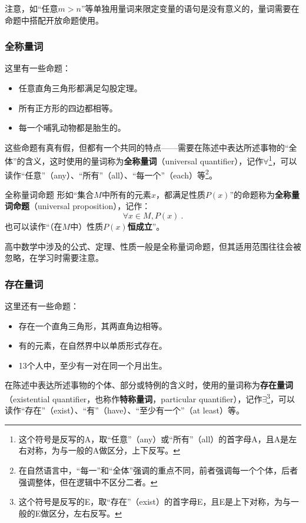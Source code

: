 注意，如“任意$m>n$”等单独用量词来限定变量的语句是没有意义的，量词需要在命题中搭配开放命题使用。

\subsubsection{全称量词}

这里有一些命题：
\begin{itemize}
\item 任意直角三角形都满足勾股定理。
\item 所有正方形的四边都相等。
\item 每一个哺乳动物都是胎生的。
\end{itemize}

这些命题有真有假，但都有一个共同的特点——需要在陈述中表达所述事物的“全体”的含义，这时使用的量词称为\textbf{全称量词}（universal quantifier），记作$\forall$\footnote{这个符号是反写的A，取“任意”（any）或“所有”（all）的首字母A，且A是左右对称，为与一般的A做区分，上下反写。}，可以读作“任意”（any）、“所有”（all）、“每一个”（each）等\footnote{在自然语言中，“每一”和“全体”强调的重点不同，前者强调每一个个体，后者强调整体，但在逻辑中不区分二者。}。

\begin{definition}{全称量词命题}
形如“集合$M$中所有的元素$x$，都满足性质$P(x)$”的命题称为\textbf{全称量词命题}（universal proposition），记作：
\begin{equation}
\forall x\in M,P(x)~.
\end{equation}
也可以读作“（在$M$中）性质$P(x)$\textbf{恒成立}”。
\end{definition}

高中数学中涉及的公式、定理、性质一般是全称量词命题，但其适用范围往往会被忽略，在学习时需要注意。

\subsubsection{存在量词}

这里还有一些命题：
\begin{itemize}
\item 存在一个直角三角形，其两直角边相等。
\item 有的元素，在自然界中以单质形式存在。
\item 13个人中，至少有一对在同一个月出生。
\end{itemize}
在陈述中表达所述事物的个体、部分或特例的含义时，使用的量词称为\textbf{存在量词}（existential quantifier，也称作\textbf{特称量词}，particular quantifier），记作$\exists$\footnote{这个符号是反写的E，取“存在”（exist）的首字母E，且E是上下对称，为与一般的E做区分，左右反写。}，可以读作“存在”（exist）、“有”（have）、“至少有一个”（at least）等。

